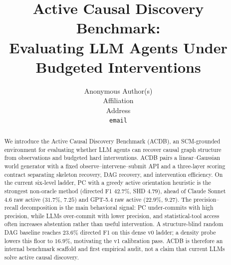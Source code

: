 \documentclass{article}
\title{Active Causal Discovery Benchmark:\\
Evaluating LLM Agents Under Budgeted Interventions}
\author{%
  Anonymous Author(s) \\
  Affiliation \\
  Address \\
  \texttt{email}
}
\begin{document}
\maketitle

\begin{abstract}
We introduce the Active Causal Discovery Benchmark (ACDB), an SCM-grounded environment for evaluating whether LLM agents can recover causal graph structure from observations and budgeted hard interventions. ACDB pairs a linear--Gaussian world generator with a fixed observe--intervene--submit API and a three-layer scoring contract separating skeleton recovery, DAG recovery, and intervention efficiency. On the current six-level ladder, PC with a greedy active orientation heuristic is the strongest non-oracle method (directed F1 $42.7\%$, SHD $4.79$), ahead of Claude Sonnet 4.6 raw active ($31.7\%$, $7.25$) and GPT-5.4 raw active ($22.9\%$, $9.27$). The precision--recall decomposition is the main behavioral signal: PC under-commits with high precision, while LLMs over-commit with lower precision, and statistical-tool access often increases abstention rather than useful intervention. A structure-blind random DAG baseline reaches $23.6\%$ directed F1 on this dense v0 ladder; a density probe lowers this floor to $16.9\%$, motivating the v1 calibration pass. ACDB is therefore an internal benchmark scaffold and first empirical audit, not a claim that current LLMs solve active causal discovery.
\end{abstract}












\end{document}
